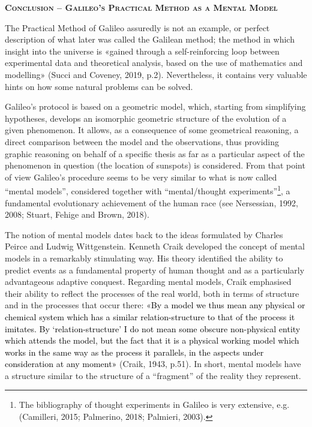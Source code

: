 \documentclass[a4paper]{article}
\begin{document}
{\centering\bfseries\scshape
Conclusion – Galileo’s Practical Method as a Mental Model
\par}

The Practical Method of Galileo assuredly is not an example, or perfect description of what later was called the
Galilean method; the method in which insight into the universe is «gained through a self-reinforcing loop between
experimental data and theoretical analysis, based on the use of mathematics and modelling»
\label{ref:RNDOyv2c9QvdT}(Succi and Coveney, 2019, p.2). Nevertheless, it contains very valuable hints on how some
natural problems can be solved.

Galileo’s protocol is based on a geometric model, which, starting from simplifying hypotheses, develops an isomorphic
geometric structure of the evolution of a given phenomenon. It allows, as a consequence of some geometrical reasoning,
a direct comparison between the model and the observations, thus providing graphic reasoning on behalf of a specific
thesis as far as a particular aspect of the phenomenon in question (the location of sunspots) is considered. From that
point of view Galileo’s procedure seems to be very similar to what is now called “mental models”, considered together
with “mental/thought experiments”\footnote{ The bibliography of thought experiments in Galileo is very extensive, e.g.
\label{ref:RNDMucBAFXpFg}(Camilleri, 2015; Palmerino, 2018; Palmieri, 2003). }, a fundamental evolutionary achievement
of the human race \label{ref:RNDzUssfgcd3F}(see Nersessian, 1992, 2008; Stuart, Fehige and Brown, 2018).

The notion of mental models dates back to the ideas formulated by Charles Peirce and Ludwig Wittgenstein. Kenneth Craik
developed the concept of mental models in a remarkably stimulating way. His theory identified the ability to predict
events as a fundamental property of human thought and as a particularly advantageous adaptive conquest. Regarding
mental models, Craik emphasised their ability to reflect the processes of the real world, both in terms of structure
and in the processes that occur there: «\textcolor{black}{By a model we thus mean any physical or chemical system which
has a similar relation-structure to that of the process it imitates. By ‘relation-structure’ I do not mean some obscure
non-physical entity which attends the model, but the fact that it is a physical working model which works in the same
way as the process it parallels, in the aspects under consideration at any moment»} \label{ref:RNDCqLUJ0e2RC}(Craik,
1943, p.51). In short, mental models have a structure similar to the structure of a “fragment” of the reality they
represent.
\end{document}

